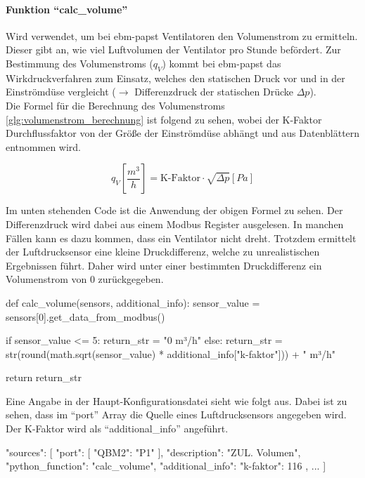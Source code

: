 \paragraph{Funktion \enquote{calc\_volume}}
Wird verwendet, um bei ebm-papst Ventilatoren den Volumenstrom zu ermitteln. Dieser gibt an, wie viel Luftvolumen der Ventilator pro Stunde befördert. Zur Bestimmung des Volumenstroms ($q_{V}$) kommt bei ebm-papst das Wirkdruckverfahren zum Einsatz, welches den statischen Druck vor und in der Einströmdüse vergleicht ($\rightarrow$ Differenzdruck der statischen Drücke $\Delta p$). \\
Die Formel für die Berechnung des Volumenstroms \eqref{glg:volumenstrom_berechnung} ist folgend zu sehen, wobei der K-Faktor \bzw Durchflussfaktor \cite[vgl.][]{rox_klimatechnik:o.J.} von der Größe der Einströmdüse abhängt und aus Datenblättern entnommen wird. \cite[vgl.][171]{ebmpapst:2021}

\begin{equation}
	q_{V}\left[\frac{m^{3}}{h}\right] = \text{K-Faktor} \cdot \sqrt{\Delta p} \left[Pa\right]
	\label{glg:volumenstrom_berechnung}
\end{equation} 

Im unten stehenden Code ist die Anwendung der obigen Formel zu sehen. Der Differenzdruck wird dabei aus einem Modbus Register ausgelesen. In manchen Fällen kann es dazu kommen, dass ein Ventilator nicht dreht. Trotzdem ermittelt der Luftdrucksensor eine kleine Druckdifferenz, welche zu unrealistischen Ergebnissen führt. Daher wird unter einer bestimmten Druckdifferenz ein Volumenstrom von 0 zurückgegeben.

\begin{pythoncode}
def calc_volume(sensors, additional_info):
	sensor_value = sensors[0].get_data_from_modbus()
	
	if sensor_value <= 5:
		return_str = "0 m³/h"
	else:
		return_str = str(round(math.sqrt(sensor_value) * additional_info["k-faktor"])) + " m³/h"
	
	return return_str
\end{pythoncode}

Eine Angabe in der Haupt-Konfigurationsdatei sieht wie folgt aus. Dabei ist zu sehen, dass im \enquote{port} Array die Quelle eines Luftdrucksensors angegeben wird. Der K-Faktor wird als \enquote{additional\_info} angeführt.

\begin{jsoncode}
"sources": [
	{
		"port": [
			{"QBM2": "P1"}
		],
		"description": "ZUL. Volumen",
		"python_function": "calc_volume",
		"additional_info": {"k-faktor": 116}
	},
	...
]
\end{jsoncode}



